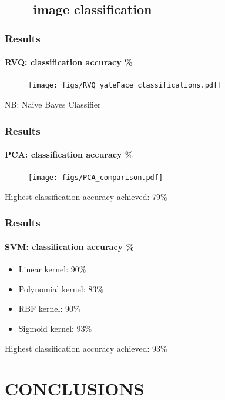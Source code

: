 \subsection{\ \ \ \ image classification}

\begin{frame}
\frametitle{Results}
\framesubtitle{RVQ: classification accuracy \%}
\logoCSIPCPL\mypagenum
	\begin{figure}
		\texttt{[image: figs/RVQ\_yaleFace\_classifications.pdf]}
	\end{figure}
	{\tiny NB: Naive Bayes Classifier}\\
\end{frame}


\begin{frame}
\frametitle{Results}
\framesubtitle{PCA: classification accuracy \%}
\logoCSIPCPL\mypagenum	
	\begin{figure}
		\texttt{[image: figs/PCA\_comparison.pdf]}
	\end{figure}
	{\color{red} Highest classification accuracy achieved: 79\%}
\end{frame}


\begin{frame}
\frametitle{Results}
\framesubtitle{SVM: classification accuracy \%}
\logoCSIPCPL\mypagenum
	\begin{itemize}
		\item Linear kernel: 90\%
		\item Polynomial kernel: 83\%
		\item RBF kernel: 90\% 
		\item Sigmoid kernel: 93\%
	\end{itemize}
	{\color{red} Highest classification accuracy achieved: 93\%}
\end{frame}




\section{CONCLUSIONS}
